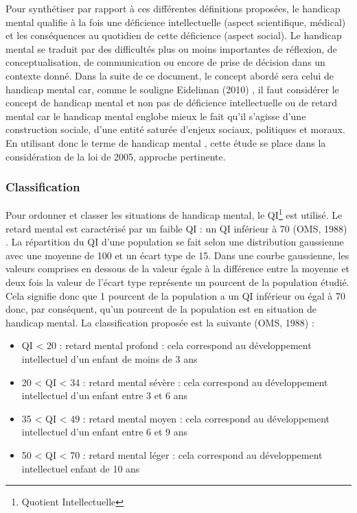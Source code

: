 Pour synthétiser par rapport à ces différentes définitions proposées, le handicap mental qualifie à la fois une déficience intellectuelle (aspect scientifique, médical) et les conséquences au quotidien de cette déficience (aspect social). Le handicap mental se traduit par des difficultés plus ou moins importantes de réflexion, de conceptualisation, de communication ou encore de prise de décision dans un contexte donné. Dans la suite de ce document, le concept abordé sera celui de handicap mental car, comme le souligne Eideliman (2010) \cite{Eideliman2010}, il faut considérer le concept de \og handicap mental \fg{} et non pas de \og déficience intellectuelle \fg{} ou de \og retard mental \fg{} car le handicap mental englobe mieux le fait qu’il s’agisse d’une construction sociale, d’une entité saturée d’enjeux sociaux, politiques et moraux. En utilisant donc le terme de \og handicap mental \fg{}, cette étude se place dans la considération de la loi de 2005, approche pertinente.


\subsubsection{Classification}

Pour ordonner et classer les situations de handicap mental, le QI\footnote{Quotient Intellectuelle} est utilisé. Le retard mental est caractérisé par un faible QI : un QI inférieur à 70 (OMS, 1988) \cite{OMS1988}. La répartition du QI d'une population se fait selon une distribution gaussienne avec une moyenne de 100 et un écart type de 15.
Dans une courbe gaussienne, les valeurs comprises en dessous de la valeur égale à la différence entre la moyenne et deux fois la valeur de l'écart type représente un pourcent de la population étudié.
Cela signifie donc que 1 pourcent de la population a un QI inférieur ou égal à 70 donc, par conséquent, qu'un pourcent de la population est en situation de handicap mental.
La classification proposée est la suivante (OMS, 1988) \cite{OMS1988} :
\begin{itemize}
\item QI < 20 : retard mental profond : cela correspond au développement intellectuel d’un enfant de moins de 3 ans
\item 20 < QI < 34 : retard mental sévère : cela correspond au développement intellectuel d’un enfant entre 3 et 6 ans
\item 35 < QI < 49 : retard mental moyen : cela correspond au développement intellectuel d’un enfant entre 6 et 9 ans
\item 50 < QI < 70 : retard mental léger : cela correspond au développement intellectuel enfant de 10 ans
\end{itemize}

